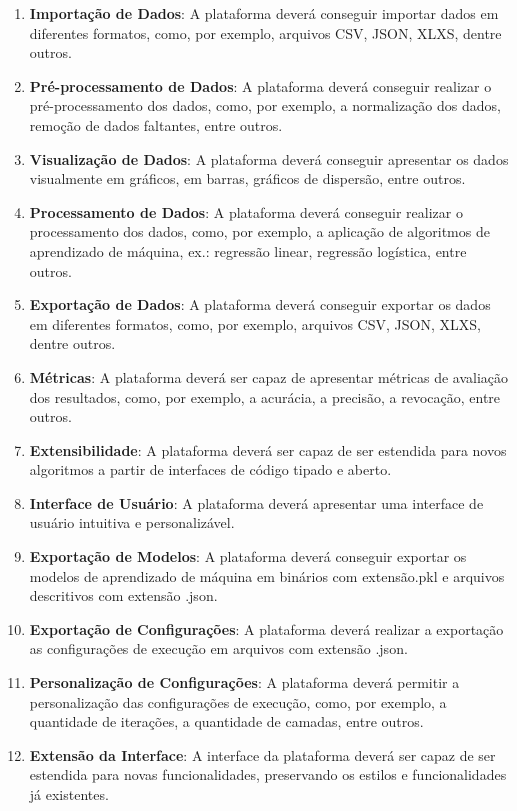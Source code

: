     \begin{enumerate}
        \item \textbf{Importação de Dados}: A plataforma deverá conseguir importar dados em diferentes formatos, como, por exemplo, arquivos CSV, JSON, XLXS, dentre outros.
        \item \textbf{Pré-processamento de Dados}: A plataforma deverá conseguir realizar o pré-processamento dos dados, como, por exemplo, a normalização dos dados, remoção de dados faltantes, entre outros.
        \item \textbf{Visualização de Dados}: A plataforma deverá conseguir apresentar os dados visualmente em gráficos, em barras, gráficos de dispersão, entre outros.
        \item \textbf{Processamento de Dados}: A plataforma deverá conseguir realizar o processamento dos dados, como, por exemplo, a aplicação de algoritmos de aprendizado de máquina, ex.: regressão linear, regressão logística, entre outros.
        \item \textbf{Exportação de Dados}: A plataforma deverá conseguir exportar os dados em diferentes formatos, como, por exemplo, arquivos CSV, JSON, XLXS, dentre outros.
        \item \textbf{Métricas}: A plataforma deverá ser capaz de apresentar métricas de avaliação dos resultados, como, por exemplo, a acurácia, a precisão, a revocação, entre outros.
        \item \textbf{Extensibilidade}: A plataforma deverá ser capaz de ser estendida para novos algoritmos a partir de interfaces de código tipado e aberto.
        \item \textbf{Interface de Usuário}: A plataforma deverá apresentar uma interface de usuário intuitiva e personalizável.
        \item \textbf{Exportação de Modelos}: A plataforma deverá conseguir exportar os modelos de aprendizado de máquina em binários com extensão.pkl e arquivos descritivos com extensão .json.
        \item \textbf{Exportação de Configurações}: A plataforma deverá realizar a exportação as configurações de execução em arquivos com extensão .json.
        \item \textbf{Personalização de Configurações}: A plataforma deverá permitir a personalização das configurações de execução, como, por exemplo, a quantidade de iterações, a quantidade de camadas, entre outros.
        \item \textbf{Extensão da Interface}: A interface da plataforma deverá ser capaz de ser estendida para novas funcionalidades, preservando os estilos e funcionalidades já existentes.
    \end{enumerate}

